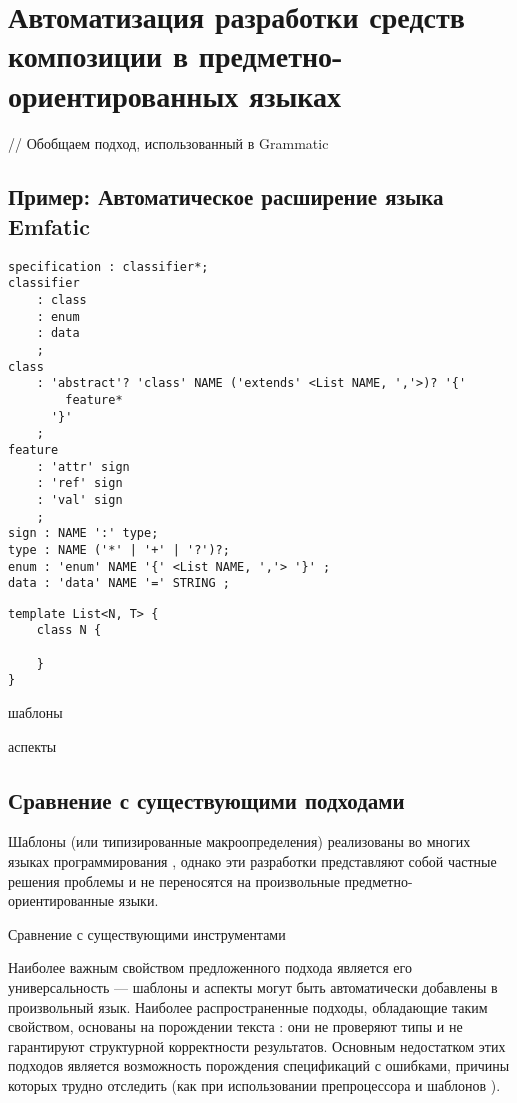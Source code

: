 \part{Автоматизация разработки средств композиции в предметно-ориентированных языках}\label{part4}

// Обобщаем подход, использованный в Grammatic





\chapter{Пример: Автоматическое расширение языка Emfatic}

\begin{lstlisting}
specification : classifier*;
classifier
	: class
	: enum
	: data
	;
class
	: 'abstract'? 'class' NAME ('extends' <List NAME, ','>)? '{'
		feature*
	  '}'
	;
feature
	: 'attr' sign
	: 'ref' sign
	: 'val' sign
	;
sign : NAME ':' type;
type : NAME ('*' | '+' | '?')?;
enum : 'enum' NAME '{' <List NAME, ','> '}' ;
data : 'data' NAME '=' STRING ;
\end{lstlisting}

\begin{lstlisting}
template List<N, T> {
	class N {
		
	}
}

\end{lstlisting}

шаблоны

аспекты

\chapter{Сравнение с существующими подходами}

Шаблоны (или типизированные макроопределения) реализованы во многих языках программирования \cite{???}, однако эти разработки представляют собой частные решения проблемы и не переносятся на произвольные предметно-ориентированные языки.

\begin{table}[htb]
	\centering
\newcommand{\dissonly}[1]{#1}

	\caption{Сравнение \GRM{} с существующими инструментами}\label{TmpTable}
\end{table}

Наиболее важным свойством предложенного подхода является его универсальность --- шаблоны и аспекты могут быть автоматически добавлены в произвольный язык. Наиболее распространенные подходы, обладающие таким свойством, основаны на порождении текста \cite{???}: они не проверяют типы и не гарантируют структурной корректности результатов. Основным недостатком этих подходов является возможность порождения спецификаций с ошибками, причины которых трудно отследить (как при использовании препроцессора  и шаблонов ).

